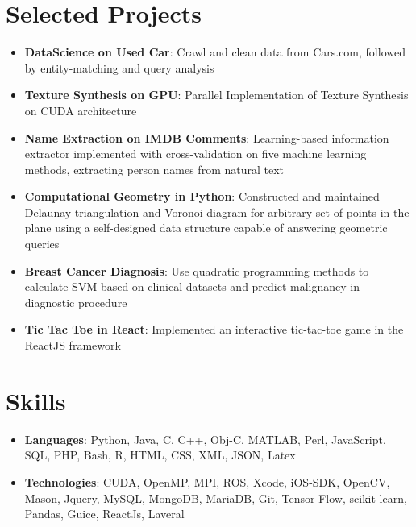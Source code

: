 \documentclass[a4paper,11pt]{article}
\newcommand{\projectItem}[2]{
	\item\small{
    \textbf{#1}{: #2 \vspace{-6pt}}
  }
}
\newcommand{\skillItem}[2]{
	\item\small{
    \textbf{#1}{: #2 \vspace{-5pt}}
  }
}
\newcommand{\sectionStart}{\begin{itemize}[leftmargin=*]}
\newcommand{\sectionEnd}{\end{itemize}}
\begin{document}
\section{Selected Projects}
	\sectionStart
		\projectItem{DataScience on Used Car}
		{Crawl and clean data from Cars.com, followed by entity-matching and query analysis}
		\projectItem{Texture Synthesis on GPU}
		{Parallel Implementation of Texture Synthesis on CUDA architecture}
		\projectItem{Name Extraction on IMDB Comments}
		{Learning-based information extractor implemented with cross-validation on five machine learning methods, extracting person names from natural text}
		\projectItem{Computational Geometry in Python}
		{Constructed and maintained Delaunay triangulation and Voronoi diagram for arbitrary set of points in the plane using a self-designed data structure capable of answering geometric queries}
		\projectItem{Breast Cancer Diagnosis}
		{Use quadratic programming methods to calculate SVM based on clinical datasets and predict malignancy in diagnostic procedure}
		\projectItem{Tic Tac Toe in React}
		{Implemented an interactive tic-tac-toe game in the ReactJS framework}
	\sectionEnd

\section{Skills}
	\sectionStart
		\skillItem{Languages}
		{Python, Java, C, C++, Obj-C, MATLAB, Perl, JavaScript, SQL, PHP, Bash, R, HTML, CSS, XML, JSON, Latex}
		\skillItem{Technologies}
		{CUDA, OpenMP, MPI, ROS, Xcode, iOS-SDK, OpenCV, Mason, Jquery, MySQL, MongoDB, MariaDB, Git, Tensor Flow, scikit-learn, Pandas, Guice, ReactJs, Laveral}
	\sectionEnd
\end{document}
